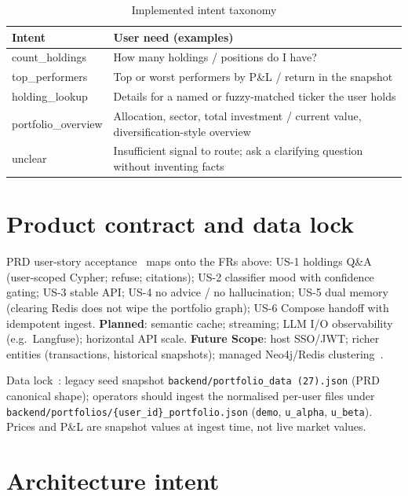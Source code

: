 \begin{table}[!htbp]
\centering
\small
\caption{Implemented intent taxonomy}
\label{tab:intents}
\begin{tabularx}{\textwidth}{@{}
  >{\ttfamily\raggedright\arraybackslash}p{}
  >{\raggedright\arraybackslash}X
  @{}}
\toprule
\textbf{Intent} & \textbf{User need (examples)} \\
\midrule
count\_holdings &
How many holdings / positions do I have? \\
\addlinespace
top\_performers &
Top or worst performers by P\&L / return in the snapshot \\
\addlinespace
holding\_lookup &
Details for a named or fuzzy-matched ticker the user holds \\
\addlinespace
portfolio\_overview &
Allocation, sector, total investment / current value, diversification-style overview \\
\addlinespace
unclear &
Insufficient signal to route; ask a clarifying question without inventing facts \\
\bottomrule
\end{tabularx}
\end{table}

\section{Product contract and data lock}

PRD user-story acceptance~\cite{prd} maps onto the FRs above: US-1 holdings Q\&A (user-scoped Cypher; refuse; citations); US-2 classifier mood with confidence gating; US-3 stable API; US-4 no advice / no hallucination; US-5 dual memory (clearing Redis does not wipe the portfolio graph); US-6 Compose handoff with idempotent ingest. \textbf{Planned}: semantic cache; streaming; LLM I/O observability (e.g.\ Langfuse); horizontal API scale. \textbf{Future Scope}: host SSO/JWT; richer entities (transactions, historical snapshots); managed Neo4j/Redis clustering~\cite{prd}.

Data lock~\cite{prd}: legacy seed snapshot \texttt{backend/portfolio\_data (27).json} (PRD canonical shape); operators should ingest the normalised per-user files under \texttt{backend/portfolios/\{user\_id\}\_portfolio.json} (\texttt{demo}, \texttt{u\_alpha}, \texttt{u\_beta}). Prices and P\&L are snapshot values at ingest time, not live market values.

\section{Architecture intent}

